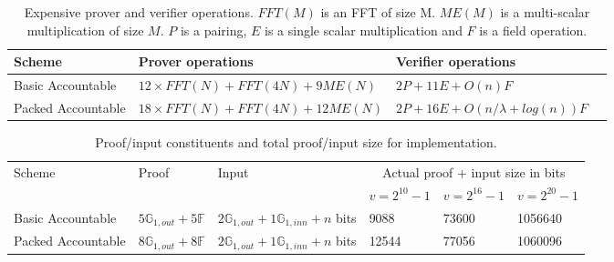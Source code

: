 \begin{table}[h!]
\hfill
\begin{tabular}{| l | l| l| l|}
\hline
Scheme & Prover operations  &Verifier operations \\
\hline
Basic Accountable & $12\times FFT(N)+FFT(4N)+9ME(N)$  & $2P+11E+O(n)F$ \\
Packed Accountable & $18\times FFT(N)+FFT(4N)+12ME(N)$  & $2P+16E+O(n/\lambda+log(n))F$ \\
\hline
\end{tabular}
\caption{Expensive prover and verifier operations. $FFT(M)$ is an FFT of size M. $ME(M)$ is a  multi-scalar multiplication of size $M$. $P$ is a pairing, $E$ is a single scalar multiplication and $F$ is a field operation.}
\label{tab:operations}
\end{table}
\begin{table}[h!]
\begin{tabular}{| l | l | l | l | l | l |}
\hline
Scheme & Proof & Input & \multicolumn{3}{|c|}{Actual proof + input size in bits} \\
\cline{4-6}
& & & $v = 2^{10}-1$ & $v = 2^{16}-1$ & $v = 2^{20}-1$ \\
\hline
Basic Accountable & $5\mathbb{G}_{1,out}+5\mathbb{F}$ & $2\mathbb{G}_{1,out}+1\mathbb{G}_{1,inn}+n$ bits & 9088 & 73600 & 1056640 \\
Packed Accountable & $8\mathbb{G}_{1,out}+8\mathbb{F}$ & $2\mathbb{G}_{1,out}+1\mathbb{G}_{1,inn}+n$ bits & 12544 & 77056 & 1060096 \\
\hline
\end{tabular}
\caption{Proof/input constituents and total proof/input size for implementation.}
\label{tab:proof-size}
\end{table}
